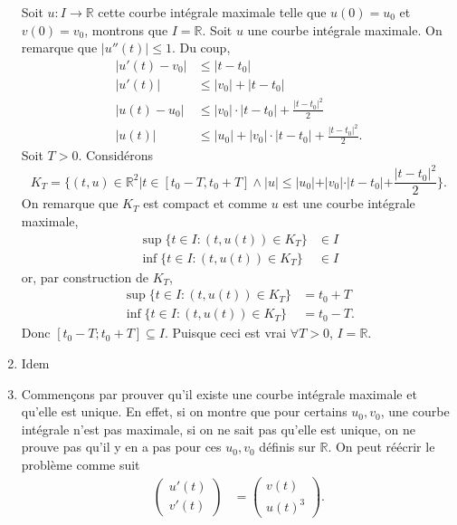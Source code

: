 \documentclass{article}
\begin{document}
\begin{enumerate}
    Soit $u:I\to\mathbb{R}$ cette courbe intégrale maximale telle que
    $u(0) = u_0$ et $v(0) = v_0$, montrons que $I = \mathbb{R}$.
    Soit $u$ une courbe intégrale maximale.
    On remarque que $|u''(t)| \leq 1$.
    Du coup,
    \begin{align*}
      |u'(t) - v_0| & \leq |t - t_0|\\
      |u'(t)| & \leq |v_0| + |t - t_0|\\
      |u(t) - u_0| & \leq |v_0|\cdot|t - t_0| + \frac{|t - t_0|^2}{2}\\
      |u(t)| & \leq |u_0| + |v_0|\cdot|t - t_0| + \frac{|t - t_0|^2}{2}.
    \end{align*}
    Soit $T > 0$. Considérons
    \[ K_T = \{(t,u) \in \mathbb{R}^2|
    t \in [t_0-T,t_0+T] \land |u| \leq
    |u_0| + |v_0|\cdot|t - t_0| + \frac{|t - t_0|^2}{2}\}. \]
    On remarque que $K_T$ est compact et comme $u$ est une courbe intégrale
    maximale,
    \begin{align*}
      \sup\{t \in I : (t,u(t)) \in K_T\} & \in I\\
      \inf\{t \in I : (t,u(t)) \in K_T\} & \in I
    \end{align*}
    or, par construction de $K_T$,
    \begin{align*}
      \sup\{t \in I : (t,u(t)) \in K_T\} & = t_0 + T\\
      \inf\{t \in I : (t,u(t)) \in K_T\} & = t_0 - T.
    \end{align*}
    Donc $[t_0-T;t_0+T] \subseteq I$.
    Puisque ceci est vrai $\forall T > 0$, $I = \mathbb{R}$.
  \item
    Idem \smiley
  \item
    Commençons par prouver qu'il existe une courbe intégrale maximale
    et qu'elle est unique.
    En effet, si on montre que pour certains $u_0,v_0$, une courbe intégrale
    n'est pas maximale, si on ne sait pas qu'elle est unique,
    on ne prouve pas qu'il y en a pas pour ces $u_0,v_0$
    définis sur $\mathbb{R}$.
    On peut réécrir le problème comme suit
    \begin{align*}
      \begin{pmatrix}
        u'(t)\\
        v'(t)
      \end{pmatrix} & =
      \begin{pmatrix}
        v(t)\\
        u(t)^3
      \end{pmatrix}.
    \end{align*}


\end{enumerate}
\end{document}

